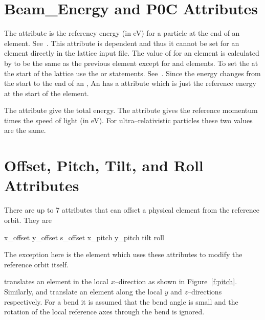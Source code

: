 \section{Beam\_Energy and P0C Attributes}
\label{s:energy}

The  attribute is the referency energy (in eV) for a
particle at the end of an element.
See~. This attribute is dependent and thus
it cannot be set for an element directly in the lattice input
file. The value of  for an element is calculated by
\bmad to be the same as the previous element except for 
and  elements. To set the  at the start of
the lattice use the  or  statements.
See~. Since the energy changes from the start to the end
of an , An  has a  attribute
which is just the reference energy at the start of the element.

The  attribute give the total energy. The 
attribute gives the reference momentum times the speed of light (in
eV). For ultra--relativistic particles these two values are the same.

\section{Offset, Pitch, Tilt, and Roll Attributes}
\label{s:offset}

There are up to 7 attributes that can offset a physical element
from the reference orbit. They are
\begin{example}
  x_offset
  y_offset
  s_offset
  x_pitch
  y_pitch
  tilt
  roll
\end{example}
The exception here is the  element which uses these
attributes to modify the reference orbit itself.

 translates an element in the local $x$--direction
as shown in Figure~\ref{f:pitch}. Similarly,  and 
 translate an element along the local $y$ and 
$z$--directions respectively. For a bend it is assumed that
the bend angle is small and the rotation of the local reference
axes through the bend is ignored.

